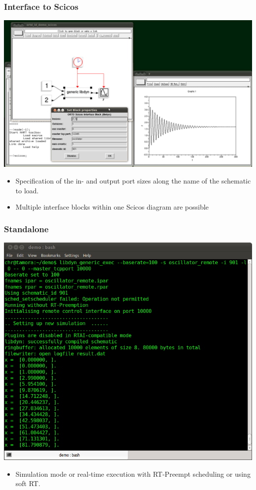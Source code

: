 \documentclass[serif,9pt,xcolor=dvipsnames]{beamer}
\begin{document}
\begin{frame}[fragile]
  \frametitle{Interface to Scicos}

  \centering \includegraphics[trim=0mm 0mm 80mm 80mm, clip, width=1\linewidth]{figures/ortd_scicos_interface.png} 

  \begin{itemize}
   \item Specification of the in- and output port sizes along the name of the schematic to load.
   \item Multiple interface blocks within one Scicos diagram are possible
  \end{itemize}

\end{frame}


\begin{frame}[fragile]
  \frametitle{Standalone}

  \centering \includegraphics[trim=0mm 0mm 00mm 00mm, clip, width=0.8\linewidth]{figures/start_from_console.png} 

  \begin{itemize}
   \item Simulation mode or real-time execution with RT-Preempt scheduling or using soft RT.
  \end{itemize}

\end{frame}
\end{document}
